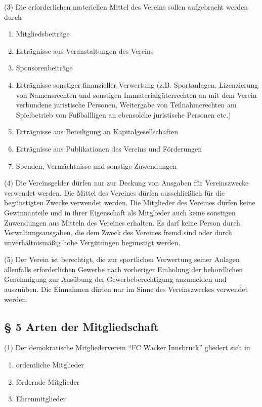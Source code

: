 \documentclass[10pt,a4paper]{article}
\begin{document}
(3)
Die erforderlichen materiellen Mittel des Vereins sollen aufgebracht werden durch

\begin{enumerate}[label=\alph*)]
\item
Mitgliedsbeiträge
\item
Erträgnisse aus Veranstaltungen des Vereins
\item
Sponsorenbeiträge
\item
Erträgnisse sonstiger finanzieller Verwertung (z.B. Sportanlagen, Lizenzierung von Namensrechten und sonstigen Immaterialgüterrechten an mit dem Verein verbundene juristische Personen, Weitergabe von Teilnahmerechten am Spielbetrieb von Fußballligen an ebensolche juristische Personen etc.)
\item
Erträgnisse aus Beteiligung an Kapitalgesellschaften
\item
Erträgnisse aus Publikationen des Vereins und Förderungen
\item
Spenden, Vermächtnisse und sonstige Zuwendungen
\end{enumerate}

(4)
Die Vereinsgelder dürfen nur zur Deckung von Ausgaben für Vereinszwecke verwendet werden.
Die Mittel des Vereines dürfen ausschließlich für die begünstigten Zwecke verwendet werden.
Die Mitglieder des Vereines dürfen keine Gewinnanteile und in ihrer Eigenschaft als Mitglieder auch keine sonstigen Zuwendungen aus Mitteln des Vereines erhalten.
Es darf keine Person durch Verwaltungsausgaben, die dem Zweck des Vereines fremd sind oder durch unverhältnismäßig hohe Vergütungen begünstigt werden.

(5)
Der Verein ist berechtigt, die zur sportlichen Verwertung seiner Anlagen allenfalls erforderlichen Gewerbe nach vorheriger Einholung der behördlichen Genehmigung zur Ausübung der Gewerbeberechtigung anzumelden und auszuüben.
Die Einnahmen dürfen nur im Sinne des Vereinszweckes verwendet werden.

\subsection{§ 5
Arten der Mitgliedschaft}

(1)
Der demokratische Mitgliederverein "`FC Wacker Innsbruck"' gliedert sich in

\begin{enumerate}[label=\alph*)]
\item
ordentliche Mitglieder
\item
fördernde Mitglieder
\item
Ehrenmitglieder
\end{enumerate}
\end{document}
